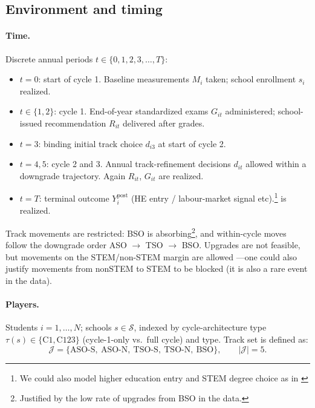 \documentclass{article}
\begin{document}
\subsection{Environment and timing}

\paragraph{Time.} Discrete annual periods $t \in \{0, 1, 2, 3, \ldots, T\}$:
\begin{itemize}
  \item $t=0$: start of cycle 1. Baseline measurements $M_i$ taken; school enrollment $s_i$ realized.
  \item $t \in \{1, 2\}$: cycle 1. End-of-year standardized exams $G_{it}$ administered; school-issued recommendation $R_{it}$ delivered after grades.
  \item $t = 3$: binding initial track choice $d_{i3}$ at start of cycle 2.
  \item $t =4, 5$: cycle 2 and 3. Annual track-refinement decisions $d_{it}$ allowed within a downgrade trajectory. Again $R_{it}$, $G_{it}$ are realized.
  \item $t = T$: terminal outcome $Y^{\mathrm{post}}_i$ (HE entry / labour-market signal etc).\footnote{We could also model higher education entry and STEM degree choice as in \citet{de_groote_dynamic_2025}} is realized.
\end{itemize}

Track movements are restricted: BSO is absorbing\footnote{Justified by the low rate of upgrades from BSO in the data.}, and within-cycle moves follow the downgrade order ASO $\to$ TSO $\to$ BSO. Upgrades are not feasible, but movements on the STEM/non-STEM margin are allowed ---one could also justify movements from nonSTEM to STEM to be blocked (it is also a rare event in the data).

\paragraph{Players.} Students $i = 1, \ldots, N$; schools $s \in \mathcal{S}$, indexed by cycle-architecture type $\tau(s) \in \{\mathrm{C1}, \mathrm{C123}\}$ (cycle-1-only vs.\ full cycle) and type. Track set is defined as:
\begin{equation}
  \mathcal{J} = \{\mathrm{ASO\text{-}S},\ \mathrm{ASO\text{-}N},\ \mathrm{TSO\text{-}S},\ \mathrm{TSO\text{-}N},\ \mathrm{BSO}\}, \qquad |\mathcal{J}| = 5.
  \label{eq:tracks}
\end{equation}
\end{document}
